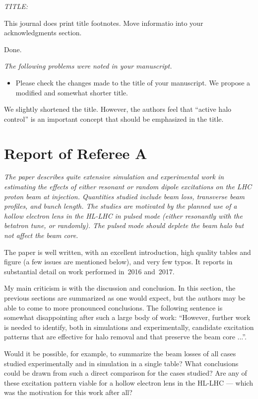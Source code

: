\documentclass[aps
,prstab
,preprint,tightenlines
,amsfonts,amssymb,amsmath
]{revtex4-1}
\newenvironment{co}{\em}{}
\newcommand{\bco}{\begin{co}}
\newcommand{\eco}{\end{co}}
\newenvironment{re}{\color{NavyBlue}}{}
\newcommand{\bre}{\begin{re}}
\newcommand{\ere}{\end{re}}
\begin{document}
\bco
TITLE:

This journal does print title footnotes.  Move informatio into your
acknowledgments section.
\eco

\bre Done.\ere

\bco
The following problems were noted in your manuscript.

\begin{itemize}
\item Please check the changes made to the title of your manuscript.
  We propose a modified and somewhat shorter title.
\end{itemize}
\eco

\bre We slightly shortened the title. However, the authors feel that
``active halo control'' is an important concept that should be
emphasized in the title. \ere


\section*{Report of Referee A}

\bco
The paper describes quite extensive simulation and experimental work 
in estimating the effects of either resonant or random dipole 
excitations on the LHC proton beam at injection. Quantities studied 
include beam loss, transverse beam profiles, and bunch length. The 
studies are motivated by the planned use of a hollow electron lens in 
the HL-LHC in pulsed mode (either resonantly with the betatron tune, 
or randomly). The pulsed mode should deplete the beam halo but not 
affect the beam core. 

The paper is well written, with an excellent introduction, high 
quality tables and figure (a few issues are mentioned below), and very 
few typos. It reports in substantial detail on work performed in~2016 
and~2017. 

My main criticism is with the discussion and conclusion. In this 
section, the previous sections are summarized as one would expect, but 
the authors may be able to come to more pronounced conclusions. The 
following sentence is somewhat disappointing after such a large body 
of work: ``However, further work is needed to identify, both in 
simulations and experimentally, candidate excitation patterns that are 
effective for halo removal and that preserve the beam core ...''. 

Would it be possible, for example, to summarize the beam losses of all
cases studied experimentally and in simulation in a single table? What
conclusions could be drawn from such a direct comparison for the cases
studied? Are any of these excitation pattern viable for a hollow
electron lens in the HL-LHC --- which was the motivation for this work
after all?
\end{document}
